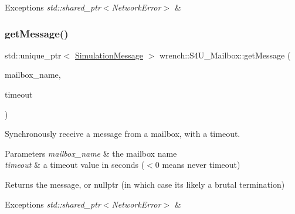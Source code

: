 \begin{DoxyExceptions}{Exceptions}
{\em std\+::shared\+\_\+ptr$<$\+Network\+Error$>$} & \\
\hline
\end{DoxyExceptions}
\mbox{\label{classwrench_1_1_s4_u___mailbox_adf71050cad0d388b80ebde63f7fd76ae}} 
\subsubsection{\texorpdfstring{get\+Message()}{getMessage()}\hspace{0.1cm}{\footnotesize\ttfamily [2/2]}}
{\footnotesize\ttfamily std\+::unique\+\_\+ptr$<$ \hyperlink{classwrench_1_1_simulation_message}{Simulation\+Message} $>$ wrench\+::\+S4\+U\+\_\+\+Mailbox\+::get\+Message (\begin{DoxyParamCaption}\item[{std\+::string}]{mailbox\+\_\+name,  }\item[{double}]{timeout }\end{DoxyParamCaption})\hspace{0.3cm}{\ttfamily [static]}}



Synchronously receive a message from a mailbox, with a timeout. 


\begin{DoxyParams}{Parameters}
{\em mailbox\+\_\+name} & the mailbox name \\
\hline
{\em timeout} & a timeout value in seconds ($<$0 means never timeout) \\
\hline
\end{DoxyParams}
\begin{DoxyReturn}{Returns}
the message, or nullptr (in which case it\textquotesingle{}s likely a brutal termination)
\end{DoxyReturn}

\begin{DoxyExceptions}{Exceptions}
{\em std\+::shared\+\_\+ptr$<$\+Network\+Error$>$} & \\
\hline
\end{DoxyExceptions}
\mbox{\label{classwrench_1_1_s4_u___mailbox_a3db23771a2e97e8740f67cdaf02ae3a1}} 
